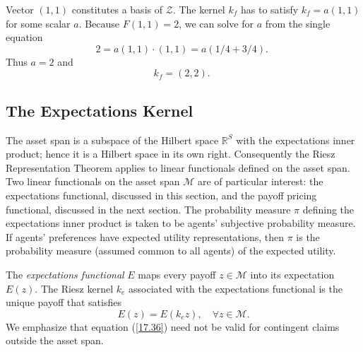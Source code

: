 \documentclass[\topdir/lecture\_notes.tex]{subfiles}
\begin{document}
\begin{optional}
\begin{example}
Vector $(1,1)$ constitutes a basis of $\mathcal{Z}$. The kernel $k_{f}$ has to satisfy $k_{f}=a(1,1)$ for some scalar $a$. Because $F(1,1)=2$, we can solve for $a$ from the single equation
\begin{equation*}
2=a(1,1) \cdot(1,1)=a(1 / 4+3 / 4) \text {. } 
\end{equation*}
Thus $a=2$ and
\begin{equation*}
k_{f}=(2,2) \text {. } 
\end{equation*}
\end{example}
\end{optional}

\subsection{The Expectations Kernel}
The asset span is a subspace of the Hilbert space $\mathbb{R}^{S}$ with the expectations inner product; hence it is a Hilbert space in its own right. Consequently the Riesz Representation Theorem applies to linear functionals defined on the asset span. Two linear functionals on the asset span $\mathcal{M}$ are of particular interest: the expectations functional, discussed in this section, and the payoff pricing functional, discussed in the next section. The probability measure $\pi$ defining the expectations inner product is taken to be agents' subjective probability measure. If agents' preferences have expected utility representations, then $\pi$ is the probability measure (assumed common to all agents) of the expected utility.

The \emph{expectations functional} $E$ maps every payoff $z \in \mathcal{M}$ into its expectation $E(z)$. The Riesz kernel $k_{e}$ associated with the expectations functional is the unique payoff that satisfies
\begin{equation}
E(z)=E\left(k_{e} z\right), \quad \forall z \in \mathcal{M}. \label{17.36}
\end{equation}
We emphasize that equation (\ref{17.36}) need not be valid for contingent claims outside the asset span.
\end{document}
